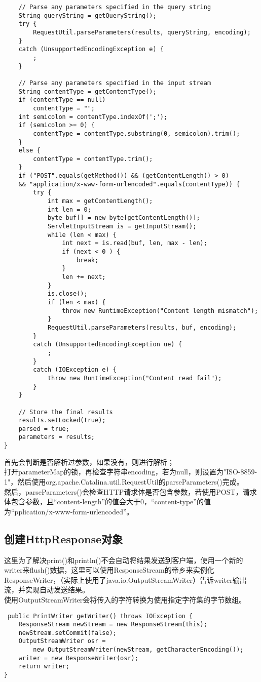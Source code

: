 \begin{enumerate}
\begin{lstlisting}
	// Parse any parameters specified in the query string
	String queryString = getQueryString();
	try {
		RequestUtil.parseParameters(results, queryString, encoding);
	}
	catch (UnsupportedEncodingException e) {
		;
	}
	
	// Parse any parameters specified in the input stream
	String contentType = getContentType();
	if (contentType == null)
		contentType = "";
	int semicolon = contentType.indexOf(';');
	if (semicolon >= 0) {
		contentType = contentType.substring(0, semicolon).trim();
	}
	else {
		contentType = contentType.trim();
	}
	if ("POST".equals(getMethod()) && (getContentLength() > 0)
	&& "application/x-www-form-urlencoded".equals(contentType)) {
		try {
			int max = getContentLength();
			int len = 0;
			byte buf[] = new byte[getContentLength()];
			ServletInputStream is = getInputStream();
			while (len < max) {
				int next = is.read(buf, len, max - len);
				if (next < 0 ) {
					break;
				}
				len += next;
			}
			is.close();
			if (len < max) {
				throw new RuntimeException("Content length mismatch");
			}
			RequestUtil.parseParameters(results, buf, encoding);
		}
		catch (UnsupportedEncodingException ue) {
			;
		}
		catch (IOException e) {
			throw new RuntimeException("Content read fail");
		}
	}
	
	// Store the final results
	results.setLocked(true);
	parsed = true;
	parameters = results;
}
\end{lstlisting}
首先会判断是否解析过参数，如果没有，则进行解析；\\
打开parameterMap的锁，再检查字符串encoding，若为null，则设置为"ISO-8859-1"，然后使用org.apache.Catalina.util.RequestUtil的parseParameters()完成。\\
然后，parseParameters()会检查HTTP请求体是否包含参数，若使用POST，请求体包含参数，且“content-length”的值会大于0，“content-type”的值为“pplication/x-www-form-urlencoded”。
\end{enumerate}
\subsection{创建HttpResponse对象}
这里为了解决print()和println()不会自动将结果发送到客户端，使用一个新的
writer来flush()数据，这里可以使用ResponseStream的帝乡来实例化ResponseWriter，（实际上使用了java.io.OutputStreamWriter）告诉writer输出流，并实现自动发送结果。\\
使用OutputStreamWriter会将传入的字符转换为使用指定字符集的字节数组。
\begin{lstlisting}
 public PrintWriter getWriter() throws IOException {
	ResponseStream newStream = new ResponseStream(this);
	newStream.setCommit(false);
	OutputStreamWriter osr =
		new OutputStreamWriter(newStream, getCharacterEncoding());
	writer = new ResponseWriter(osr);
	return writer;
}
\end{lstlisting}
